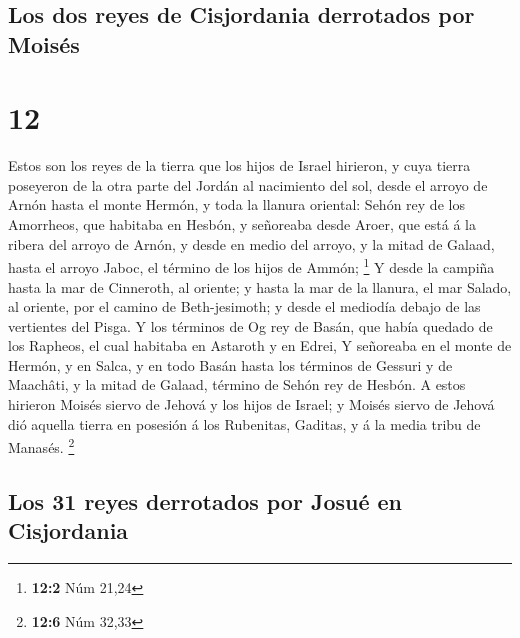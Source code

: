 \hypertarget{los-dos-reyes-de-cisjordania-derrotados-por-moisuxe9s}{%
\subsection{Los dos reyes de Cisjordania derrotados por
Moisés}\label{los-dos-reyes-de-cisjordania-derrotados-por-moisuxe9s}}

\hypertarget{section-11}{%
\section{12}\label{section-11}}

 Estos son los reyes de la tierra que los hijos de Israel
hirieron, y cuya tierra poseyeron de la otra parte del Jordán al
nacimiento del sol, desde el arroyo de Arnón hasta el monte Hermón, y
toda la llanura oriental:  Sehón rey de los Amorrheos, que
habitaba en Hesbón, y señoreaba desde Aroer, que está á la ribera del
arroyo de Arnón, y desde en medio del arroyo, y la mitad de Galaad,
hasta el arroyo Jaboc, el término de los hijos de Ammón; \footnote{\textbf{12:2}
  Núm 21,24}  Y desde la campiña hasta la mar de Cinneroth,
al oriente; y hasta la mar de la llanura, el mar Salado, al oriente, por
el camino de Beth-jesimoth; y desde el mediodía debajo de las vertientes
del Pisga.  Y los términos de Og rey de Basán, que había
quedado de los Rapheos, el cual habitaba en Astaroth y en Edrei,
 Y señoreaba en el monte de Hermón, y en Salca, y en todo
Basán hasta los términos de Gessuri y de Maachâti, y la mitad de Galaad,
término de Sehón rey de Hesbón.  A estos hirieron Moisés
siervo de Jehová y los hijos de Israel; y Moisés siervo de Jehová dió
aquella tierra en posesión á los Rubenitas, Gaditas, y á la media tribu
de Manasés. \footnote{\textbf{12:6} Núm 32,33}

\hypertarget{los-31-reyes-derrotados-por-josuuxe9-en-cisjordania}{%
\subsection{Los 31 reyes derrotados por Josué en
Cisjordania}\label{los-31-reyes-derrotados-por-josuuxe9-en-cisjordania}}

